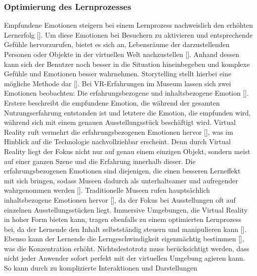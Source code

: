 \documentclass[a4paper,12pt,oneside]{article}
\begin{document}
      \subsubsection{Optimierung des Lernprozesses} \label{Optimierung des Lernprozesses}
        Empfundene Emotionen steigern bei einem Lernprozess nachweislich 
        den erhöhten Lernerfolg [\cite[29]{Heidsiek2019}].
        Um diese Emotionen bei Besuchern zu aktivieren und entsprechende
        Gefühle hervorzurufen, bietet es sich an, Lebensräume der darzustellenden Personen
        oder Objekte in der virtuellen Welt nachzustellen [\cite[35-36]{Heidsiek2019}].
        Anhand dessen kann sich der Benutzer noch besser in die Situation hineinbegeben
        und komplexe Gefühle und Emotionen besser wahrnehmen. Storytelling stellt hierbei
        eine mögliche Methode dar [\cite[35-39]{Heidsiek2019}].
        Bei VR-Erfahrungen im Museum lassen sich zwei Emotionen beobachten: 
        Die erfahrungsbezogene und inhaltsbezogene Emotion [\cite[69]{Heidsiek2019}]. 
        Erstere beschreibt die
        empfundene Emotion, die während der gesamten Nutzungserfahrung entstanden ist und
        letztere die Emotion, die empfunden wird, während sich mit einem genauen
        Ausstellungsstück beschäftigt wird. Virtual Reality ruft vermehrt die 
        erfahrungsbezogenen Emotionen hervor [\cite[69]{Heidsiek2019}], was im Hinblick auf
        die Technologie nachvollziehbar erscheint. Denn durch Virtual Reality liegt der
        Fokus nicht nur auf genau einem einzigen Objekt, sondern meist auf einer ganzen
        Szene und die Erfahrung innerhalb dieser. Die erfahrungsbezogenen Emotionen 
        sind diejenigen, die einen besseren
        Lerneffekt mit sich bringen, sodass Museen dadurch als unterhaltsamer und
        aufregender wahrgenommen werden [\cite[69]{Heidsiek2019}]. Traditionelle Museen rufen 
        hauptsächlich inhaltsbezogene Emotionen hervor [\cite[69]{Heidsiek2019}], da der
        Fokus bei Ausstellungen oft auf einzelnen Ausstellungsstücken liegt.
        Immersive Umgebungen, die Virtual Reality in hoher Form bieten kann, tragen ebenfalls
        zu einem optimierten Lernprozess bei, da der Lernende den Inhalt selbstständig steuern
        und manipulieren kann [\cite[777]{Katz2015}]. Ebenso kann der Lernende
        die Lerngeschwindigkeit eigenmächtig bestimmen [\cite[777]{Katz2015}],
        was die Konzentration erhöht. Nichtsdestotrotz muss berücksichtigt werden,
        dass nicht jeder Anwender sofort perfekt mit der virtuellen Umgebung agieren
        kann. So kann durch zu komplizierte Interaktionen und Darstellungen
\end{document}
